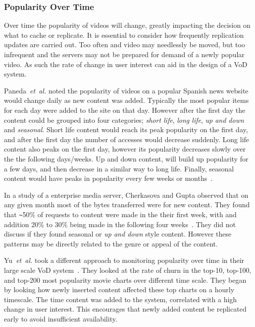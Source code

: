 \subsubsection{Popularity Over Time}
\label{sect:pop_over_time}
    Over time the popularity of videos will change, greatly impacting the decision on what to cache or replicate. It is essential to consider how frequently replication updates are carried out. Too often and video may needlessly be moved, but too infrequent and the servers may not be prepared for demand of a newly popular video. As such the rate of change in user interest can aid in the design of a VoD system.

    Paneda~\emph{et~al.} noted the popularity of videos on a popular Spanish news website would change daily as new content was added. Typically the most popular items for each day were added to the site on that day. However after the first day the content could be grouped into four categories; \emph{short life}, \emph{long life}, \emph{up and down} and \emph{seasonal}. Short life content would reach its peak popularity on the first day, and after the first day the number of accesses would decrease suddenly. Long life content also peaks on the first day, however its popularity decreases slowly over the the following days/weeks. Up and down content, will build up popularity for a few days, and then decrease in a similar way to long life. Finally, seasonal content would have peaks in popularity every few weeks or months~\cite{paneda2006pav}.

    In a study of a enterprise media server, Cherkasova and Gupta observed that on any given month most of the bytes transferred were for new content. They found that \verb+~+50\% of requests to content were made in the their first week, with and addition 20\% to 30\% being made in the following four weeks~\cite{cherkasova2004aoe}. They did not discuss if they found seasonal or \emph{up and down} style content. However these patterns may be directly related to the genre or appeal of the content.

    Yu~\emph{et~al.} took a different approach to monitoring popularity over time in their large scale VoD system~\cite{yu2006uub}. They looked at the rate of churn in the top-10, top-100, and top-200 most popularity movie charts over different time scale. They began by looking how newly inserted content affected these top charts on a hourly timescale. The time content was added to the system, correlated with a high change in user interest. This encourages that newly added content be replicated early to avoid insufficient availability.

